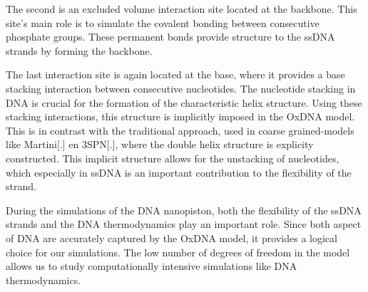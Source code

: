 The second is an excluded volume interaction site located at the backbone.
This site's main role is to simulate the covalent bonding between consecutive phosphate
groups. These permanent bonds provide structure to the ssDNA strands by forming the
backbone.

The last interaction site is again located at the base, where it provides a base stacking
interaction between consecutive nucleotides. The nucleotide stacking in DNA is crucial
for the formation of the characteristic helix structure. Using these stacking
interactions, this structure is implicitly imposed in the OxDNA model. This is in
contrast with the traditional approach, used in coarse grained-models like Martini[.] en
3SPN[.],
where the double helix structure is explicity constructed. This
implicit structure allows for the
unstacking of nucleotides, which especially in ssDNA is an important contribution to the
flexibility of the strand.

During the simulations of the DNA nanopiston, both the flexibility of the ssDNA strands
and the DNA thermodynamics play an important role. Since both aspect of DNA are
accurately captured by the OxDNA model, it provides a logical choice
for our simulations. The low number of degrees of freedom in the model allows us to
study computationally intensive simulations like DNA thermodynamics.
